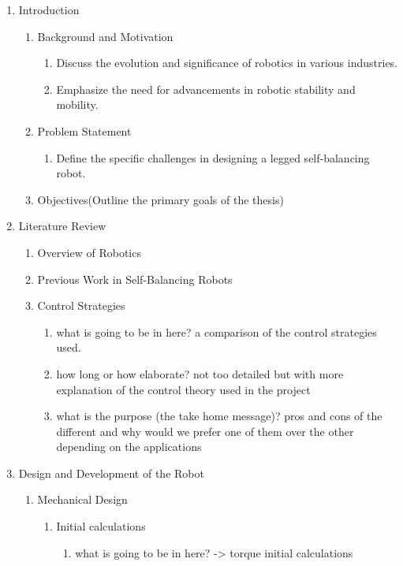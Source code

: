 \begin{enumerate}
	\item Introduction
	\begin{enumerate}
		\item Background and Motivation
		\begin{enumerate}
			\item Discuss the evolution and significance of robotics in various industries.
			\item Emphasize the need for advancements in robotic stability and mobility.
		\end{enumerate}

		\item Problem Statement
		\begin{enumerate}
			\item Define the specific challenges in designing a legged self-balancing robot.
		\end{enumerate}
		\item Objectives(Outline the primary goals of the thesis)
	\end{enumerate}
	\item Literature Review
	\begin{enumerate}
		\item Overview of Robotics
		\item Previous Work in Self-Balancing Robots
		\item Control Strategies 
		\begin{enumerate}
			\item what is going to be in here? a comparison of the control strategies used.
			\item how long or how elaborate? not too detailed but with more explanation of the control theory used in the project
			\item what is the purpose (the take home message)? pros and cons of the different and why would we prefer one of them over the other depending on the applications
		\end{enumerate}
	\end{enumerate}
	\item Design and Development of the Robot
	\begin{enumerate}
		\item Mechanical Design
		\begin{enumerate}
			\item Initial calculations 
			\begin{enumerate}
				\item what is going to be in here? -> torque initial calculations

\end{enumerate}
\end{enumerate}
\end{enumerate}
\end{enumerate}
